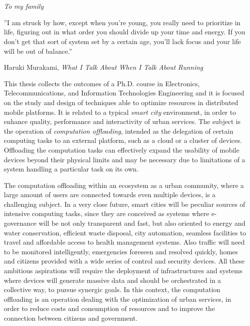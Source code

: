 \documentclass[twoside,openright]{report}
\begin{document}
\beforepreface
\chapter*{}
\begin{flushright} 
\textit{To my family} 
\end{flushright}

\bigbreak
\bigbreak
\bigbreak
\bigbreak
\bigbreak
\bigbreak
\bigbreak
\bigbreak
\bigbreak
\bigbreak
\bigbreak
\bigbreak
\bigbreak
\bigbreak
\bigbreak
\bigbreak
\bigbreak
\bigbreak
\bigbreak
\bigbreak

''I am struck by how, except when you're young, you really need to prioritize in life, figuring out in what order you should divide up your time and energy. If you don't get that sort of system set by a certain age, you'll lack focus and your life will be out of balance.''
\bigbreak

\hfill Haruki Murakami, \textit{What I Talk About When I Talk About Running}

This thesis collects the outcomes of a Ph.D. course in Electronics, Telecommunications, and Information Technologies Engineering and it is focused on the study and design of techniques able to optimize resources in distributed mobile platforms. It is related to a typical \emph{smart city} environment, in order to enhance quality, performance and interactivity of urban services. 
The subject is the operation of \emph{computation offloading}, intended as the delegation of certain computing tasks to an external platform, such as a cloud or a cluster of devices.
Offloading the computation tasks can effectively expand the usability of mobile devices beyond their physical limits and may be necessary due to limitations of a  system handling a particular task on its own. 

The computation offloading within an ecosystem as a urban community, where a large amount of users are connected towards even multiple devices, is a challenging subject. 
In a very close future, smart cities will be  peculiar sources of intensive computing tasks, since they are conceived as systems where e-governance will be not only transparent and fast, but also oriented to energy and water conservation, efficient waste disposal, city automation, seamless facilities to travel and affordable access to health management systems. 
Also traffic will need to be monitored intelligently, emergencies foreseen and resolved quickly, homes and citizens provided with a wide series of control and security devices.
All these ambitious aspirations will require the deployment of infrastructures and systems where devices will generate massive data and should be orchestrated in a collective way, to pursue synergic goals. 
In this context, the computation offloading is an operation dealing with the optimization of urban services, in order to reduce costs and consumption of resources and to improve the connection between citizens and government. 
\end{document}

